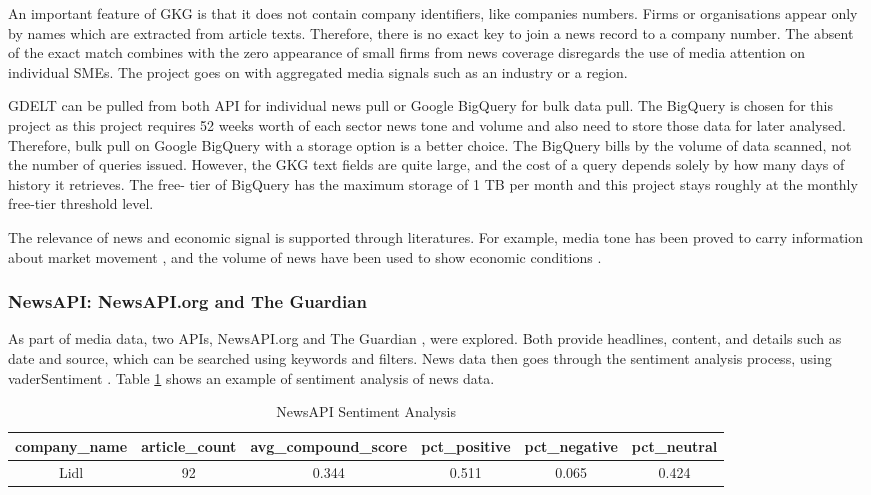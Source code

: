 \documentclass[ %
                    author={Natchalin Iwsakul \\ Inkaphol Siriwongwattana \\ Tanaphan Kummaraphat \\ Patorn Srisupap},
                supervisor={Fernando Moreno-Pino},
                    degree={MSc},
                     title={Propensity Modelling for SME Commercial Lending Using Open Public Data},
                  subtitle={Companies House filings and GDELT media coverage as predictors of first-time borrowing},
                      type={},
                      year={2026}]{dissertation}
\begin{document}
An important feature of GKG is that it does not contain company identifiers, like companies numbers. Firms or organisations appear only by names which are extracted from article texts. Therefore, there is no exact key to join a news record to a company number. The absent of the exact match combines with the zero appearance of small firms from news coverage disregards the use of media attention on individual SMEs. The project goes on with aggregated media signals such as an industry or a region.

GDELT can be pulled from both API for individual news pull or Google BigQuery for bulk data pull. The BigQuery is chosen for this project as this project requires 52 weeks worth of each sector news tone and volume and also need to store those data for later analysed. Therefore, bulk pull on Google BigQuery with a storage option is a better choice. The BigQuery bills by the volume of data scanned, not the number of queries issued. However, the GKG text fields are quite large, and the cost of a query depends solely by how many days of history it retrieves. The free- tier of BigQuery has the maximum storage of 1 TB per month and this project stays roughly at the monthly free-tier threshold level.

The relevance of news and economic signal is supported through literatures. For example, media tone has been proved to carry information about market movement \cite{tetlock2007giving}, and the volume of news have been used to show economic conditions \cite{baker2016measuring}.

\subsubsection{NewsAPI: NewsAPI.org and The Guardian}
\label{sec:newsapi}
As part of media data, two APIs, NewsAPI.org \cite{newsapi.org} and The Guardian \cite{theguardian}, were explored. Both provide headlines, content, and details such as date and source, which can be searched using keywords and filters. News data then goes through the sentiment analysis process, using vaderSentiment \cite{hutto_cjhuttovadersentiment_2026}. Table \ref{newsapisentiment} shows an example of sentiment analysis of news data.

\begin{table}[h]
    \centering
    \begin{tabular}{cccccc}
    \toprule
    company\_name & article\_count & avg\_compound\_score & pct\_positive & pct\_negative & pct\_neutral\\
    \midrule
    Lidl & 92 & 0.344 & 0.511 & 0.065 & 0.424 \\
    \bottomrule
    \end{tabular}
    \caption{NewsAPI Sentiment Analysis}
    \label{newsapisentiment}
\end{table}
\end{document}
